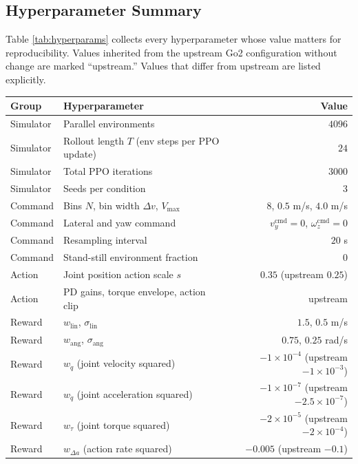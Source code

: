 \subsection{Hyperparameter Summary}

Table \ref{tab:hyperparams} collects every hyperparameter whose value matters for reproducibility. Values inherited from the upstream Go2 configuration without change are marked ``upstream.'' Values that differ from upstream are listed explicitly.

\begin{table}[ht]
\centering
\begin{tabularx}{\textwidth}{@{}l l r@{}}
\toprule
\textbf{Group} & \textbf{Hyperparameter} & \textbf{Value} \\
\midrule
Simulator  & Parallel environments & $4096$ \\
Simulator  & Rollout length $T$ (env steps per PPO update) & $24$ \\
Simulator  & Total PPO iterations & $3000$ \\
Simulator  & Seeds per condition & $3$ \\
\addlinespace
Command    & Bins $N$, bin width $\Delta v$, $V_{\max}$ & $8$, $0.5$ m/s, $4.0$ m/s \\
Command    & Lateral and yaw command & $v_y^{\mathrm{cmd}} = 0$, $\omega_z^{\mathrm{cmd}} = 0$ \\
Command    & Resampling interval & $20$ s \\
Command    & Stand-still environment fraction & $0$ \\
\addlinespace
Action     & Joint position action scale $s$ & $0.35$ (upstream $0.25$) \\
Action     & PD gains, torque envelope, action clip & upstream \\
\addlinespace
Reward     & $w_{\mathrm{lin}}$, $\sigma_{\mathrm{lin}}$ & $1.5$, $0.5$ m/s \\
Reward     & $w_{\mathrm{ang}}$, $\sigma_{\mathrm{ang}}$ & $0.75$, $0.25$ rad/s \\
Reward     & $w_{\dot{q}}$ (joint velocity squared) & $-1 \times 10^{-4}$ (upstream $-1 \times 10^{-3}$) \\
Reward     & $w_{\ddot{q}}$ (joint acceleration squared) & $-1 \times 10^{-7}$ (upstream $-2.5 \times 10^{-7}$) \\
Reward     & $w_{\tau}$ (joint torque squared) & $-2 \times 10^{-5}$ (upstream $-2 \times 10^{-4}$) \\
Reward     & $w_{\Delta a}$ (action rate squared) & $-0.005$ (upstream $-0.1$) \\

\end{tabularx}
\end{table}
